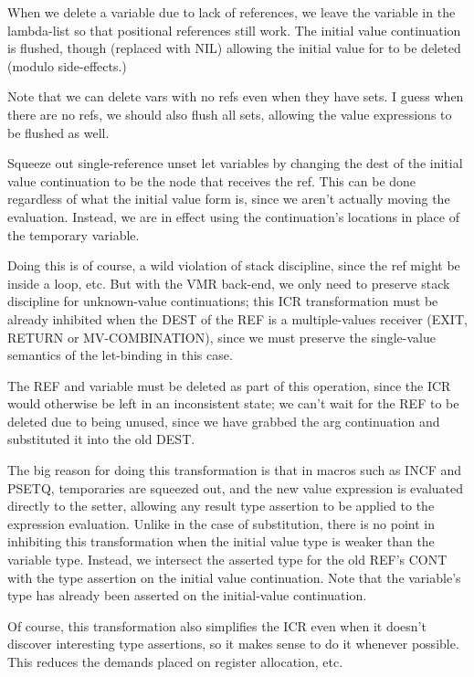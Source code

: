 When we delete a variable due to lack of references, we leave the variable
in the lambda-list so that positional references still work.  The initial value
continuation is flushed, though (replaced with NIL) allowing the initial value
for to be deleted (modulo side-effects.)

Note that we can delete vars with no refs even when they have sets.  I guess
when there are no refs, we should also flush all sets, allowing the value
expressions to be flushed as well.

Squeeze out single-reference unset let variables by changing the dest of the
initial value continuation to be the node that receives the ref.  This can be
done regardless of what the initial value form is, since we aren't actually
moving the evaluation.  Instead, we are in effect using the continuation's
locations in place of the temporary variable.  

Doing this is of course, a wild violation of stack discipline, since the ref
might be inside a loop, etc.  But with the VMR back-end, we only need to
preserve stack discipline for unknown-value continuations; this ICR
transformation must be already inhibited when the DEST of the REF is a
multiple-values receiver (EXIT, RETURN or MV-COMBINATION), since we must
preserve the single-value semantics of the let-binding in this case.

The REF and variable must be deleted as part of this operation, since the ICR
would otherwise be left in an inconsistent state; we can't wait for the REF to
be deleted due to being unused, since we have grabbed the arg continuation and
substituted it into the old DEST.

The big reason for doing this transformation is that in macros such as INCF and
PSETQ, temporaries are squeezed out, and the new value expression is evaluated
directly to the setter, allowing any result type assertion to be applied to the
expression evaluation.  Unlike in the case of substitution, there is no point
in inhibiting this transformation when the initial value type is weaker than
the variable type.  Instead, we intersect the asserted type for the old REF's
CONT with the type assertion on the initial value continuation.  Note that the
variable's type has already been asserted on the initial-value continuation.

Of course, this transformation also simplifies the ICR even when it doesn't
discover interesting type assertions, so it makes sense to do it whenever
possible.  This reduces the demands placed on register allocation, etc.


